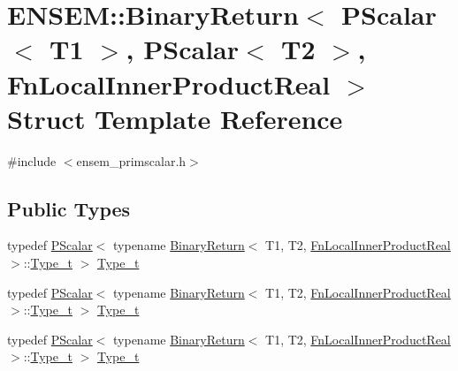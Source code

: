 \hypertarget{structENSEM_1_1BinaryReturn_3_01PScalar_3_01T1_01_4_00_01PScalar_3_01T2_01_4_00_01FnLocalInnerProductReal_01_4}{}\section{E\+N\+S\+EM\+:\+:Binary\+Return$<$ P\+Scalar$<$ T1 $>$, P\+Scalar$<$ T2 $>$, Fn\+Local\+Inner\+Product\+Real $>$ Struct Template Reference}
\label{structENSEM_1_1BinaryReturn_3_01PScalar_3_01T1_01_4_00_01PScalar_3_01T2_01_4_00_01FnLocalInnerProductReal_01_4}


{\ttfamily \#include $<$ensem\+\_\+primscalar.\+h$>$}

\subsection*{Public Types}
\begin{DoxyCompactItemize}
\item 
typedef \mbox{\hyperlink{classENSEM_1_1PScalar}{P\+Scalar}}$<$ typename \mbox{\hyperlink{structENSEM_1_1BinaryReturn}{Binary\+Return}}$<$ T1, T2, \mbox{\hyperlink{structENSEM_1_1FnLocalInnerProductReal}{Fn\+Local\+Inner\+Product\+Real}} $>$\+::\mbox{\hyperlink{structENSEM_1_1BinaryReturn_3_01PScalar_3_01T1_01_4_00_01PScalar_3_01T2_01_4_00_01FnLocalInnerProductReal_01_4_a1e6f8209d4c022351d48a99ad43d8e72}{Type\+\_\+t}} $>$ \mbox{\hyperlink{structENSEM_1_1BinaryReturn_3_01PScalar_3_01T1_01_4_00_01PScalar_3_01T2_01_4_00_01FnLocalInnerProductReal_01_4_a1e6f8209d4c022351d48a99ad43d8e72}{Type\+\_\+t}}
\item 
typedef \mbox{\hyperlink{classENSEM_1_1PScalar}{P\+Scalar}}$<$ typename \mbox{\hyperlink{structENSEM_1_1BinaryReturn}{Binary\+Return}}$<$ T1, T2, \mbox{\hyperlink{structENSEM_1_1FnLocalInnerProductReal}{Fn\+Local\+Inner\+Product\+Real}} $>$\+::\mbox{\hyperlink{structENSEM_1_1BinaryReturn_3_01PScalar_3_01T1_01_4_00_01PScalar_3_01T2_01_4_00_01FnLocalInnerProductReal_01_4_a1e6f8209d4c022351d48a99ad43d8e72}{Type\+\_\+t}} $>$ \mbox{\hyperlink{structENSEM_1_1BinaryReturn_3_01PScalar_3_01T1_01_4_00_01PScalar_3_01T2_01_4_00_01FnLocalInnerProductReal_01_4_a1e6f8209d4c022351d48a99ad43d8e72}{Type\+\_\+t}}
\item 
typedef \mbox{\hyperlink{classENSEM_1_1PScalar}{P\+Scalar}}$<$ typename \mbox{\hyperlink{structENSEM_1_1BinaryReturn}{Binary\+Return}}$<$ T1, T2, \mbox{\hyperlink{structENSEM_1_1FnLocalInnerProductReal}{Fn\+Local\+Inner\+Product\+Real}} $>$\+::\mbox{\hyperlink{structENSEM_1_1BinaryReturn_3_01PScalar_3_01T1_01_4_00_01PScalar_3_01T2_01_4_00_01FnLocalInnerProductReal_01_4_a1e6f8209d4c022351d48a99ad43d8e72}{Type\+\_\+t}} $>$ \mbox{\hyperlink{structENSEM_1_1BinaryReturn_3_01PScalar_3_01T1_01_4_00_01PScalar_3_01T2_01_4_00_01FnLocalInnerProductReal_01_4_a1e6f8209d4c022351d48a99ad43d8e72}{Type\+\_\+t}}
\end{DoxyCompactItemize}


